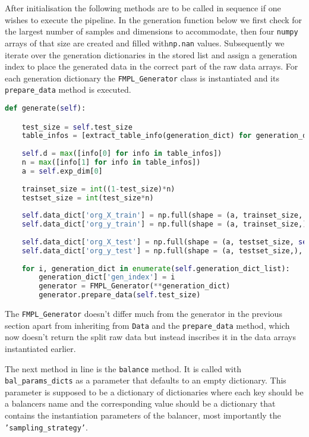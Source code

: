 After initialisation the following methods are to be called in sequence if one wishes to execute the pipeline. 
In the generation function below we first check for the largest number of samples and dimensions to accommodate, 
then four \texttt{numpy} arrays of that size are created and filled with\texttt{np.nan} values.
Subsequently we iterate over the generation dictionaries in the stored list and assign a generation index to place the generated data in the correct part of the raw data arrays.
For each generation dictionary the \texttt{FMPL\_Generator} class is instantiated and its \texttt{prepare\_data} method is executed.
\begin{lstlisting}[language=Python, numbers=none]
def generate(self):     

	test_size = self.test_size
	table_infos = [extract_table_info(generation_dict) for generation_dict in self.generation_dict_list]
	
	self.d = max([info[0] for info in table_infos])
	n = max([info[1] for info in table_infos])
	a = self.exp_dim[0]
	        
	trainset_size = int((1-test_size)*n)
	testset_size = int(test_size*n)
	
	self.data_dict['org_X_train'] = np.full(shape = (a, trainset_size, self.d), fill_value = np.nan)
	self.data_dict['org_y_train'] = np.full(shape = (a, trainset_size,), fill_value = np.nan)
	
	self.data_dict['org_X_test'] = np.full(shape = (a, testset_size, self.d), fill_value = np.nan)
	self.data_dict['org_y_test'] = np.full(shape = (a, testset_size,), fill_value = np.nan)
	
	for i, generation_dict in enumerate(self.generation_dict_list):
		generation_dict['gen_index'] = i
		generator = FMPL_Generator(**generation_dict)
		generator.prepare_data(self.test_size)
\end{lstlisting}

The \texttt{FMPL\_Generator} doesn't differ much from the generator in the previous section apart from inheriting from \texttt{Data} and the \texttt{prepare\_data} method,
which now doesn't return the split raw data but instead inscribes it in the data arrays instantiated earlier.

The next method in line is the \texttt{balance} method. It is called with \texttt{bal\_params\_dicts} as a parameter that defaults to an empty dictionary.
This parameter is supposed to be a dictionary of dictionaries where each key should be a balancers name and the corresponding value should be a dictionary 
that contains the instantiation parameters of the balancer, most importantly the \texttt{'sampling_strategy'}.

